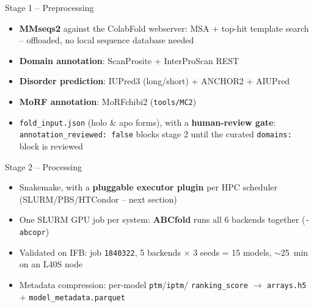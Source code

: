 \documentclass[aspectratio=169]{beamer}
\begin{document}
\begin{frame}{Stage 1 -- Preprocessing}
  \begin{itemize}
    \item \textbf{MMseqs2} against the ColabFold webserver: MSA + top-hit
      template search -- offloaded, no local sequence database needed
    \item \textbf{Domain annotation}: ScanProsite + InterProScan REST
    \item \textbf{Disorder prediction}: IUPred3 (long/short) + ANCHOR2 +
      AIUPred
    \item \textbf{MoRF annotation}: MoRFchibi2 (\texttt{tools/MC2})
    \item[$\Rightarrow$] \texttt{fold\_input.json} (holo \& apo forms), with
      a \textbf{human-review gate}: \texttt{annotation\_reviewed: false}
      blocks stage 2 until the curated \texttt{domains:} block is reviewed
  \end{itemize}
\end{frame}

\begin{frame}{Stage 2 -- Processing}
  \begin{itemize}
    \item Snakemake, with a \textbf{pluggable executor plugin} per HPC
      scheduler (SLURM/PBS/HTCondor -- next section)
    \item One SLURM GPU job per system: \textbf{ABCfold} runs all 6
      backends together (\texttt{-abcopr})
    \item Validated on IFB: job \texttt{1840322}, 5 backends $\times$ 3
      seeds = 15 models, $\sim$25~min on an L40S node
    \item Metadata compression: per-model \texttt{ptm}/\texttt{iptm}/
      \texttt{ranking\_score} $\to$ \texttt{arrays.h5} +
      \texttt{model\_metadata.parquet}
  \end{itemize}
\end{frame}
\end{document}
